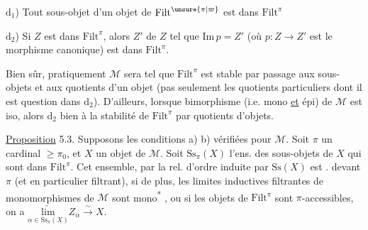 
$\mathrm d_1$) Tout sous-objet d'un objet de $\mathrm{Filt}^{\unsure{\pi|\varpi}}$ est dans $\mathrm{Filt}^{\pi}$

$\mathrm d_2$) Si $Z$ est dans $\mathrm{Filt}^{\pi}$, alors 
$Z'$ de $Z$ tel que  $\mathrm{Im}\,p=Z'$ (où
$p:Z\to Z'$ est le morphisme canonique)
est dans $\mathrm{Filt}^{\pi}$.


Bien sûr,  pratiquement $\mathcal M$ sera
tel que $\mathrm{Filt}^{\pi}$ est stable par
passage aux sous-objets  et aux
quotients d'un objet (pas seulement les
quotients particuliers dont il est question
dans $\mathrm d_2$). D'ailleurs, lorsque 
bimorphisme (i.e. mono \uline{et} épi) de $\mathcal M$
est iso, alors $\mathrm d_2$   bien à la
stabilité de $\mathrm{Filt}^{\pi}$ par quotients d'objets.

\uline{Proposition} 5.3. Supposons les conditions
a) b)   vérifiées pour $\mathcal M$. Soit
$\pi$ un cardinal $\geq\pi_0$, et $X$ un objet
de $\mathcal M$.  Soit $\mathrm{Ss}_{\pi}(X)$ l'ens.
des sous-objets de $X$ qui sont dans $\mathrm{Filt}^{\pi}$.
Cet ensemble,  par la rel. d'ordre
induite par $\mathrm{Ss}(X)$ est .
 devant $\pi$ (et en particulier filtrant),
 si de plus, les limites
inductives filtrantes de monomorphismes
de $\mathcal M$ sont mono\textsuperscript{*} , ou si les objets de $\mathrm{Filt}^{\pi}$
sont $\pi$-accessibles, on a
$\underset{\alpha\in\mathrm{Ss}_{\pi}(X)}{\underrightarrow{\mathrm{lim}}} Z_{\alpha}\overset{\sim}{\longrightarrow} X$.

